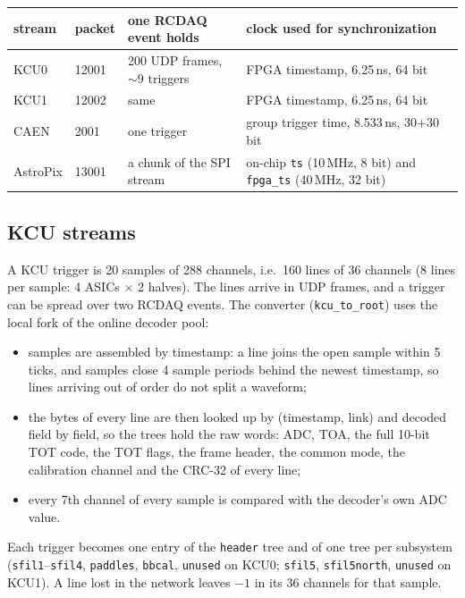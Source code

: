 \documentclass[11pt]{article}
\begin{document}
\begin{center}
\begin{tabular}{llll}
\toprule
stream & packet & one RCDAQ event holds & clock used for synchronization \\
\midrule
KCU0 & 12001 & 200 UDP frames, $\sim$9 triggers & FPGA timestamp, 6.25\,ns, 64 bit \\
KCU1 & 12002 & same & FPGA timestamp, 6.25\,ns, 64 bit \\
CAEN & 2001 & one trigger & group trigger time, 8.533\,ns, 30+30 bit \\
AstroPix & 13001 & a chunk of the SPI stream & on-chip \texttt{ts} (10\,MHz, 8 bit) and \texttt{fpga\_ts} (40\,MHz, 32 bit) \\
\bottomrule
\end{tabular}
\end{center}

\subsection*{KCU streams}

A KCU trigger is 20 samples of 288 channels, i.e.\ 160 lines of 36 channels (8 lines per sample: 4 ASICs
$\times$ 2 halves). The lines arrive in UDP frames, and a trigger can be spread over two RCDAQ events. The
converter (\texttt{kcu\_to\_root}) uses the local fork of the online decoder pool:
\begin{itemize}
  \item samples are assembled by timestamp: a line joins the open sample within 5 ticks, and samples close
        4 sample periods behind the newest timestamp, so lines arriving out of order do not split a waveform;
  \item the bytes of every line are then looked up by (timestamp, link) and decoded field by field, so the
        trees hold the raw words: ADC, TOA, the full 10-bit TOT code, the TOT flags, the frame header, the
        common mode, the calibration channel and the CRC-32 of every line;
  \item every 7th channel of every sample is compared with the decoder's own ADC value.
\end{itemize}
Each trigger becomes one entry of the \texttt{header} tree and of one tree per subsystem
(\texttt{sfil1}--\texttt{sfil4}, \texttt{paddles}, \texttt{bbcal}, \texttt{unused} on KCU0;
\texttt{sfil5}, \texttt{sfil5north}, \texttt{unused} on KCU1). A line lost in the network leaves $-1$ in its 36
channels for that sample.
\end{document}
